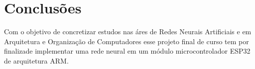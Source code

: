 \section{Conclusões}

Com o objetivo de concretizar estudos nas áres de Redes Neurais Artificiais e
em Arquitetura e Organização de Computadores esse projeto final de curso tem por finalizade
implementar uma rede neural em um módulo microcontrolador ESP32 de arquitetura ARM.

